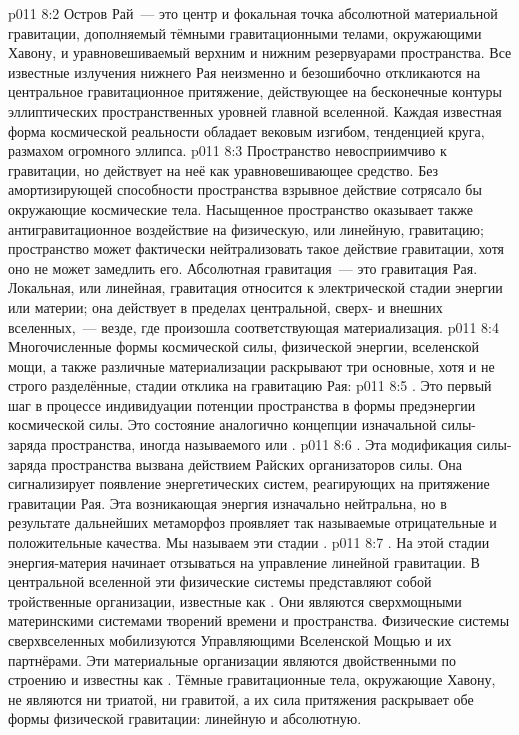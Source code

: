\vs p011 8:2 Остров Рай~--- это центр и фокальная точка абсолютной материальной гравитации, дополняемый тёмными гравитационными телами, окружающими Хавону, и уравновешиваемый верхним и нижним резервуарами пространства. Все известные излучения нижнего Рая неизменно и безошибочно откликаются на центральное гравитационное притяжение, действующее на бесконечные контуры эллиптических пространственных уровней главной вселенной. Каждая известная форма космической реальности обладает вековым изгибом, тенденцией круга, размахом огромного эллипса.
\vs p011 8:3 Пространство невосприимчиво к гравитации, но действует на неё как уравновешивающее средство. Без амортизирующей способности пространства взрывное действие сотрясало бы окружающие космические тела. Насыщенное пространство оказывает также антигравитационное воздействие на физическую, или линейную, гравитацию; пространство может фактически нейтрализовать такое действие гравитации, хотя оно не может замедлить его. Абсолютная гравитация~--- это гравитация Рая. Локальная, или линейная, гравитация относится к электрической стадии энергии или материи; она действует в пределах центральной, сверх\hyp{} и внешних вселенных,~--- везде, где произошла соответствующая материализация.
\vs p011 8:4 \pc Многочисленные формы космической силы, физической энергии, вселенской мощи, а также различные материализации раскрывают три основные, хотя и не строго разделённые, стадии отклика на гравитацию Рая:
\vs p011 8:5 . Это первый шаг в процессе индивидуации потенции пространства в формы предэнергии космической силы. Это состояние аналогично концепции изначальной силы\hyp{}заряда пространства, иногда называемого  или .
\vs p011 8:6 . Эта модификация силы\hyp{}заряда пространства вызвана действием Райских организаторов силы. Она сигнализирует появление энергетических систем, реагирующих на притяжение гравитации Рая. Эта возникающая энергия изначально нейтральна, но в результате дальнейших метаморфоз проявляет так называемые отрицательные и положительные качества. Мы называем эти стадии .
\vs p011 8:7 . На этой стадии энергия\hyp{}материя начинает отзываться на управление линейной гравитации. В центральной вселенной эти физические системы представляют собой тройственные организации, известные как . Они являются сверхмощными материнскими системами творений времени и пространства. Физические системы сверхвселенных мобилизуются Управляющими Вселенской Мощью и их партнёрами. Эти материальные организации являются двойственными по строению и известны как . Тёмные гравитационные тела, окружающие Хавону, не являются ни триатой, ни гравитой, а их сила притяжения раскрывает обе формы физической гравитации: линейную и абсолютную.
